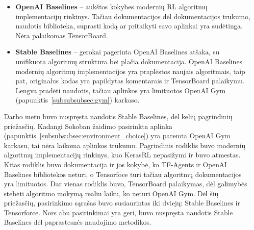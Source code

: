 \documentclass{VUMIFPSbakalaurinis}
\begin{document}
{\begin{itemize}
		\item \textbf{OpenAI Baselines} \cite{baselines} -- aukštos kokybes modernių RL algoritmų implementacijų rinkinys. Tačiau dokumentacijos dėl dokumentacijos trūkumo, naudotis biblioteka, suprasti kodą ar pritaikyti savo aplinkai yra sudėtinga. Nėra palaikomas TensorBoard.
		
		\item \textbf{Stable Baselines} \cite{stable-baselines} -- gerokai pagerinta OpenAI Baselines atšaka, su unifikuota algoritmų struktūra bei plačia dokumentacija. OpenAI Baselines modernių algoritmų implementacijos yra praplėstos naujais algoritmais, taip pat, originalus kodas yra papildytas komentarais ir TensorBoard palaikymu. Lengva pradėti naudotis, tačiau aplinkos yra limituotos OpenAI Gym (papunktis~\ref{subsubsubsec:gym}) karkaso.
	\end{itemize}\par

	Darbo metu buvo nuspręsta naudotis Stable Baselines, dėl kelių pagrindinių priežasčių. Kadangi Sokoban žaidimo pasirinkta aplinka (papunktis~\ref{subsubsubsec:environment_choice}) yra paremta OpenAI Gym karkasu, tai nėra laikoma aplinkos trūkumu. Pagrindinis rodiklis buvo modernių algoritmų implementacijų rinkinys, kuo KerasRL nepasižymi ir buvo atmestas. Kitas rodiklis buvo dokumentacija ir jos kokybė, ko TF-Agents ir OpenAI Baselines bibliotekos neturi, o Tensorfoce turi tačiau algoritmų dokumentacijos yra limituotos. Dar vienas rodiklis buvo, TensorBoard palaikymas, dėl galimybės stebėti algoritmo mokymą realiu laiku, ko neturi OpenAI Gym. Dėl šių priežasčių, pasirinkimo sąrašas buvo susiaurintas iki dviejų: Stable Baselines ir Tensorforce. Nors abu pasirinkimai yra geri, buvo nuspręsta naudotis Stable Baselines dėl paprastesnės naudojimo metodikos.
}
\end{document}
